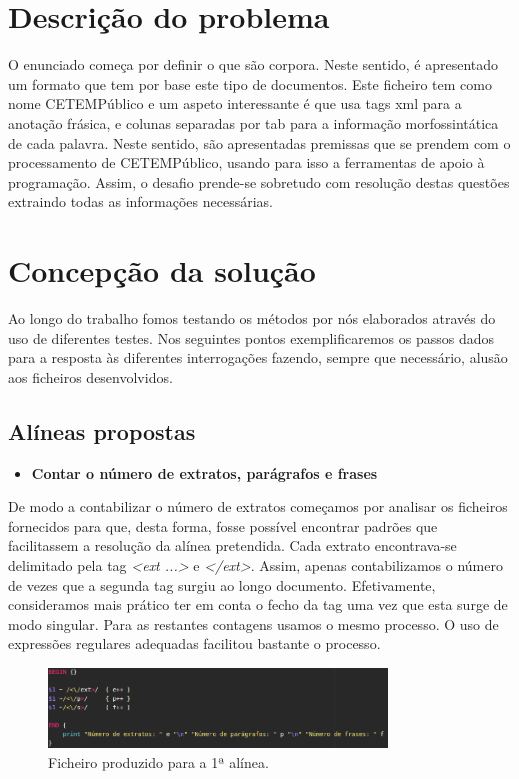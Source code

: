 \documentclass[a4paper]{article}
\begin{document}
\section{Descrição do problema}
O enunciado começa por definir o que são corpora. Neste sentido, é apresentado um formato que tem por base este tipo de documentos. Este ficheiro tem como nome CETEMPúblico e um aspeto interessante é que usa tags xml para a anotação frásica, e colunas separadas por tab para a informação morfossintática de cada palavra. Neste sentido, são apresentadas premissas que se prendem com o processamento de CETEMPúblico, usando para isso a ferramentas de apoio à programação. Assim, o desafio prende-se sobretudo com resolução destas questões extraindo todas as informações necessárias.

\section{Concepção da solução}
\label{sec:solucao}

Ao longo do trabalho fomos testando os métodos por nós elaborados através do uso de diferentes testes. Nos seguintes pontos exemplificaremos os passos dados para a resposta às diferentes interrogações fazendo, sempre que necessário, alusão aos ficheiros desenvolvidos.

\subsection{Alíneas propostas}


\begin{itemize}
	\item \textbf{Contar o número de extratos, parágrafos e frases}
\end{itemize}
De modo a contabilizar o número de extratos começamos por analisar os ficheiros fornecidos para que, desta forma, fosse possível encontrar padrões que facilitassem a resolução da alínea pretendida. Cada extrato encontrava-se delimitado pela tag \textit{<ext ...>} e \textit{</ext>}. Assim, apenas contabilizamos o número de vezes que a segunda tag surgiu ao longo documento. Efetivamente, consideramos mais prático ter em conta o fecho da tag uma vez que esta surge de modo singular. Para as restantes contagens usamos o mesmo processo. O uso de expressões regulares adequadas facilitou bastante o processo. 

\begin{figure}[h!]
  \includegraphics[width=90mm]{alinea1.png} \centering
  \caption{Ficheiro produzido para a 1ª alínea.}
  \label{fig:alinea1}
\end{figure}
\end{document}
